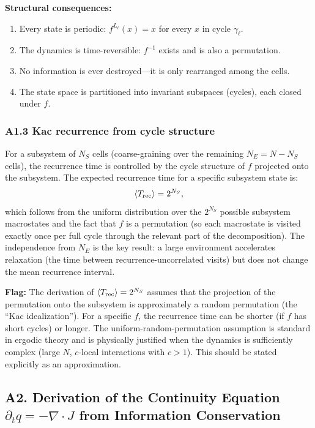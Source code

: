\documentclass[reprint]{revtex4-2}
\begin{document}
\textbf{Structural consequences:}
\begin{enumerate}[label=(\roman*)]
\item Every state is periodic: $f^{L_\ell}(x) = x$ for every $x$ in cycle $\gamma_\ell$.
\item The dynamics is time-reversible: $f^{-1}$ exists and is also a permutation.
\item No information is ever destroyed---it is only rearranged among the cells.
\item The state space is partitioned into invariant subspaces (cycles), each closed under $f$.
\end{enumerate}

\subsubsection{A1.3 Kac recurrence from cycle structure}

For a subsystem of $N_S$ cells (coarse-graining over the remaining $N_E=N-N_S$ cells), the recurrence time is controlled by the cycle structure of $f$ projected onto the subsystem. The expected recurrence time for a specific subsystem state is:
\begin{equation}
\langle T_{\rm rec}\rangle = 2^{N_S},
\end{equation}
which follows from the uniform distribution over the $2^{N_S}$ possible subsystem macrostates and the fact that $f$ is a permutation (so each macrostate is visited exactly once per full cycle through the relevant part of the decomposition). The independence from $N_E$ is the key result: a large environment accelerates relaxation (the time between recurrence-uncorrelated visits) but does not change the mean recurrence interval.

\textbf{Flag:} The derivation of $\langle T_{\rm rec}\rangle = 2^{N_S}$ assumes that the projection of the permutation onto the subsystem is approximately a random permutation (the ``Kac idealization''). For a specific $f$, the recurrence time can be shorter (if $f$ has short cycles) or longer. The uniform-random-permutation assumption is standard in ergodic theory and is physically justified when the dynamics is sufficiently complex (large $N$, $c$-local interactions with $c>1$). This should be stated explicitly as an approximation.

\subsection{A2. Derivation of the Continuity Equation $\partial_t q = -\nabla\cdot J$ from Information Conservation}
\end{document}
